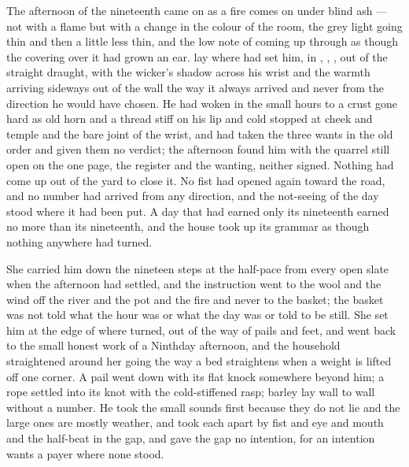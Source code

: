 The afternoon of the nineteenth came on as a fire comes on under blind ash --- not with a flame but with a change in the colour of the room, the grey light going thin and then a little less thin, and the low note of  coming up through  as though the covering over it had grown an ear.  lay where  had set him, in , , , out of the straight draught, with the wicker's shadow across his wrist and the warmth arriving sideways out of the wall the way it always arrived and never from the direction he would have chosen. He had woken in the small hours to a crust gone hard as old horn and a thread stiff on his lip and cold stopped at cheek and temple and the bare joint of the wrist, and had taken the three wants in the old order and given them no verdict; the afternoon found him with the quarrel still open on the one page, the register and the wanting, neither signed. Nothing had come up out of the yard to close it. No fist had opened again toward the road, and no number had arrived from any direction, and the not-seeing of the day stood where it had been put. A day that had earned only its nineteenth earned no more than its nineteenth, and the house took up its grammar as though nothing anywhere had turned.

She carried him down the nineteen steps at the half-pace from every open slate when the afternoon had settled, and the instruction went to the wool and the wind off the river and the pot and the fire and never to the basket; the basket was not told what the hour was or what the day was or told to be still. She set him at the edge of  where  turned, out of the way of pails and feet, and went back to the small honest work of a Ninthday afternoon, and the household straightened around her going the way a bed straightens when a weight is lifted off one corner. A pail went down with its flat knock somewhere beyond him; a rope settled into its knot with the cold-stiffened rasp; barley lay wall to wall without a number. He took the small sounds first because they do not lie and the large ones are mostly weather, and took each apart by fist and eye and mouth and the half-beat in the gap, and gave the gap no intention, for an intention wants a payer where none stood.


